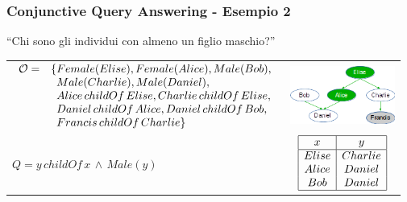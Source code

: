 \documentclass[8pt]{beamer}
\begin{document}
\begin{frame}
\frametitle{Conjunctive Query Answering - Esempio 2}
\begin{center}
``Chi sono gli individui con almeno un figlio maschio?'' 
\end{center}

\begin{tabular}{lc}
$\begin{array}{cl}
  \Ont  =  &  \{Female(Elise),  Female(Alice), Male(Bob), \\
  &\phantom{\{}Male(Charlie), Male(Daniel), \\
  &\phantom{\{}Alice\,childOf\,Elise, Charlie\,childOf\,Elise, \\
  &\phantom{\{}Daniel\,childOf\,Alice, Daniel\,childOf\,Bob, \\
  &\phantom{\{}Francis\,childOf\,Charlie \}\\
\end{array}$ &   \includegraphics[width=130px]{family.png} \\
 $Q=y\,childOf\,x\,\wedge\,Male(y)$ &
$\begin{array}{|c|c|}
  \hline
  x & y\\
  \hline
  Elise&Charlie\\
  Alice&Daniel\\
  Bob&Daniel\\
  \hline
\end{array}$\\
\end{tabular}
\end{frame}
\end{document}

